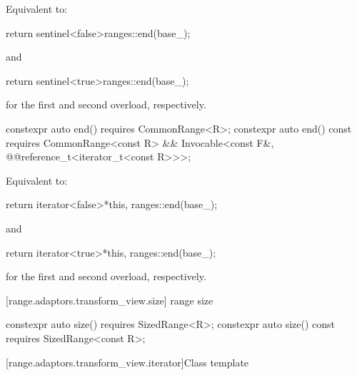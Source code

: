 {\begin{itemdescr}
\pnum
\effects Equivalent to:
\begin{codeblock}
return sentinel<false>{ranges::end(base_)};
\end{codeblock}
  and
\begin{codeblock}
return sentinel<true>{ranges::end(base_)};
\end{codeblock}
for the first and second overload, respectively.
\end{itemdescr}

%
\begin{itemdecl}
constexpr auto end() requires CommonRange<R>;
constexpr auto end() const requires CommonRange<const R> &&
  Invocable<const F&, @@reference_t<iterator_t<const R>>>;
\end{itemdecl}

\begin{itemdescr}
\pnum
\effects Equivalent to:
\begin{codeblock}
return iterator<false>{*this, ranges::end(base_)};
\end{codeblock}
  and
\begin{codeblock}
return iterator<true>{*this, ranges::end(base_)};
\end{codeblock}
for the first and second overload, respectively.
\end{itemdescr}

[range.adaptors.transform_view.size]{ range size}

%
\begin{itemdecl}
constexpr auto size() requires SizedRange<R>;
constexpr auto size() const requires SizedRange<const R>;
\end{itemdecl}

\begin{itemdescr}
\pnum
\oldtxt{\returns}  
\end{itemdescr}

[range.adaptors.transform_view.iterator]{Class template }

\pnum
{}

}
